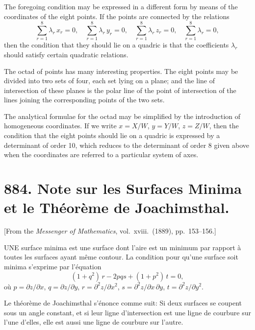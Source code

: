 \documentclass[12pt,a4paper]{article}
\theoremstyle{plain}
\begin{document}
\medskip\noindent
The foregoing condition may be expressed in a different form by means of the coordinates of the eight points. If the points are connected by the relations
\[
\sum_{r=1}^{8} \lambda_{r}\,x_{r} = 0, \quad
\sum_{r=1}^{8} \lambda_{r}\,y_{r} = 0, \quad
\sum_{r=1}^{8} \lambda_{r}\,z_{r} = 0, \quad
\sum_{r=1}^{8} \lambda_{r} = 0,
\]
then the condition that they should lie on a quadric is that the coefficients $\lambda_{r}$ should satisfy certain quadratic relations.

\medskip\noindent
The octad of points has many interesting properties. The eight points may be divided into two sets of four, each set lying on a plane; and the line of intersection of these planes is the polar line of the point of intersection of the lines joining the corresponding points of the two sets.

\medskip\noindent
The analytical formulae for the octad may be simplified by the introduction of homogeneous coordinates. If we write $x = X/W$, $y = Y/W$, $z = Z/W$, then the condition that the eight points should lie on a quadric is expressed by a determinant of order 10, which reduces to the determinant of order 8 given above when the coordinates are referred to a particular system of axes.

\newpage
\section[884]{884. Note sur les Surfaces Minima et le Th\'eor\`eme de Joachimsthal.}
\label{sec:884}

[From the \textit{Messenger of Mathematics}, vol.\ xviii.\ (1889), pp.\ 153--156.]

\medskip\noindent
UNE surface minima est une surface dont l'aire est un minimum par rapport \`a toutes les surfaces ayant m\^eme contour. La condition pour qu'une surface soit minima s'exprime par l'\'equation
\[
(1 + q^{2})\,r - 2pqs + (1 + p^{2})\,t = 0,
\]
o\`u $p = \partial z/\partial x$, $q = \partial z/\partial y$, $r = \partial^{2}z/\partial x^{2}$, $s = \partial^{2}z/\partial x\,\partial y$, $t = \partial^{2}z/\partial y^{2}$.

\medskip\noindent
Le th\'eor\`eme de Joachimsthal s'\'enonce comme suit: Si deux surfaces se coupent sous un angle constant, et si leur ligne d'intersection est une ligne de courbure sur l'une d'elles, elle est aussi une ligne de courbure sur l'autre.
\end{document}

